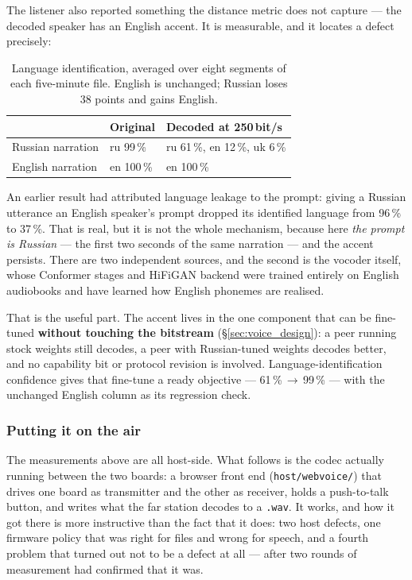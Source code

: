 The listener also reported something the distance metric does not
capture --- the decoded speaker has an English accent.  It is
measurable, and it locates a defect precisely:

\begin{table}[H]
    \centering
    \caption{Language identification, averaged over eight segments of
             each five-minute file.  English is unchanged; Russian loses
             38 points and gains English.}
    \label{tab:voice_accent}
    \small
    \begin{tabular}{@{}lll@{}}
    \toprule
    & \textbf{Original} & \textbf{Decoded at 250\,bit/s} \\
    \midrule
    Russian narration & ru 99\,\% & ru 61\,\%, en 12\,\%, uk 6\,\% \\
    English narration & en 100\,\% & en 100\,\% \\
    \bottomrule
    \end{tabular}
\end{table}

An earlier result had attributed language leakage to the prompt: giving
a Russian utterance an English speaker's prompt dropped its identified
language from 96\,\% to 37\,\%.  That is real, but it is not the whole
mechanism, because here \emph{the prompt is Russian} --- the first two
seconds of the same narration --- and the accent persists.  There are two
independent sources, and the second is the vocoder itself, whose
Conformer stages and HiFiGAN backend were trained entirely on English
audiobooks and have learned how English phonemes are realised.

That is the useful part.  The accent lives in the one component that can
be fine-tuned \textbf{without touching the bitstream}
(\S\ref{sec:voice_design}): a peer running stock weights still decodes,
a peer with Russian-tuned weights decodes better, and no capability bit
or protocol revision is involved.  Language-identification confidence
gives that fine-tune a ready objective --- 61\,\%\,$\rightarrow$\,99\,\%
--- with the unchanged English column as its regression check.

\subsubsection{Putting it on the air}
\label{sec:voice_onair}

The measurements above are all host-side.  What follows is the codec
actually running between the two boards: a browser front end
(\texttt{host/webvoice/}) that drives one board as transmitter and the
other as receiver, holds a push-to-talk button, and writes what the far
station decodes to a \texttt{.wav}.  It works, and how it got there is more
instructive than the fact that it does: two host defects, one firmware
policy that was right for files and wrong for speech, and a fourth
problem that turned out not to be a defect at all --- after two rounds
of measurement had confirmed that it was.

